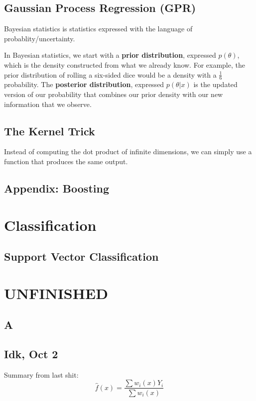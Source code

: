 \documentclass[12pt]{article}
\begin{document}
\subsection{Gaussian Process Regression (GPR)}
Bayesian statistics is statistics expressed with the language of probablity/uncertainty.

In Bayesian statistics, we start with a \textbf{prior distribution}, expressed $p(\theta)$, which is the density constructed from what we already know. For example, the prior distribution of rolling a six-sided dice would be a density with a $\frac{1}{6}$ probability. The \textbf{posterior distribution}, expressed $p(\theta|x)$ is the updated version of our probability that combines our prior density with our new information that we observe. 

\subsection{The Kernel Trick}
Instead of computing the dot product of infinite dimensions, we can simply use a function that produces the same output.

\subsection{Appendix: Boosting}

\section{Classification}

\subsection{Support Vector Classification}

\section{UNFINISHED}

\subsection{A}

\subsection{Idk, Oct 2}
Summary from last shit:
$$ \hat{f}(x) = \frac{\sum w_i(x)Y_i}{\sum w_i(x)} $$
\end{document}
